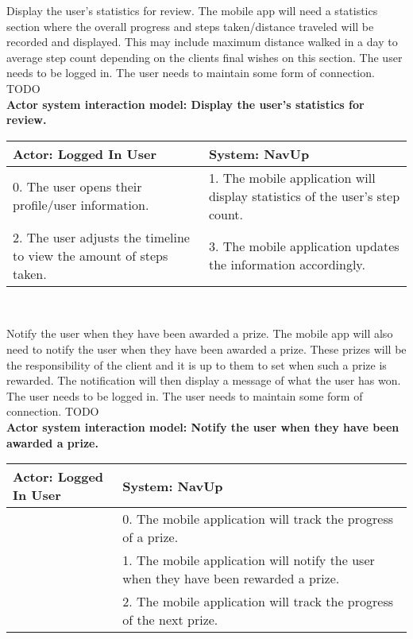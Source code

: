 \FuncReq
{Display the user's statistics for review.}
{The mobile app will need a statistics section where the overall progress and steps taken/distance traveled will be recorded and displayed. This may include maximum distance walked in a day to average step count depending on the clients final wishes on this section.}
{The user needs to be logged in.
The user needs to maintain some form of connection.}
{TODO}
\\
\textbf{Actor system interaction model: Display the user's statistics for review. }\\
\begin{tabular}{ | p{6cm} | p{6cm} |}
\hline
Actor: Logged In User & System: NavUp \\ \hline
0. The user opens their profile/user information. & 1. The mobile application will display statistics of the user's step count.\\ \hline
2. The user adjusts the timeline to view the amount of steps taken. & 3. The mobile application updates the information accordingly. \\ \hline
\end{tabular}
\\
\bigskip

\FuncReq
{Notify the user when they have been awarded a prize.}
{The mobile app will also need to notify the user when they have been awarded a prize. These prizes will be the responsibility of the client and it is up to them to set when such a prize is rewarded. The notification will then display a message of what the user has won.}
{The user needs to be logged in.
The user needs to maintain some form of connection.}
{TODO}
\\
\textbf{Actor system interaction model: Notify the user when they have been awarded a prize.}\\
\begin{tabular}{ | p{6cm} | p{6cm} |}
\hline
Actor: Logged In User & System: NavUp \\ \hline
& 0. The mobile application will track the progress of a prize.\\ \hline
& 1. The mobile application will notify the user when they have been rewarded a prize.\\ \hline
& 2. The mobile application will track the progress of the next prize.\\ \hline
\end{tabular}
\\
\bigskip

